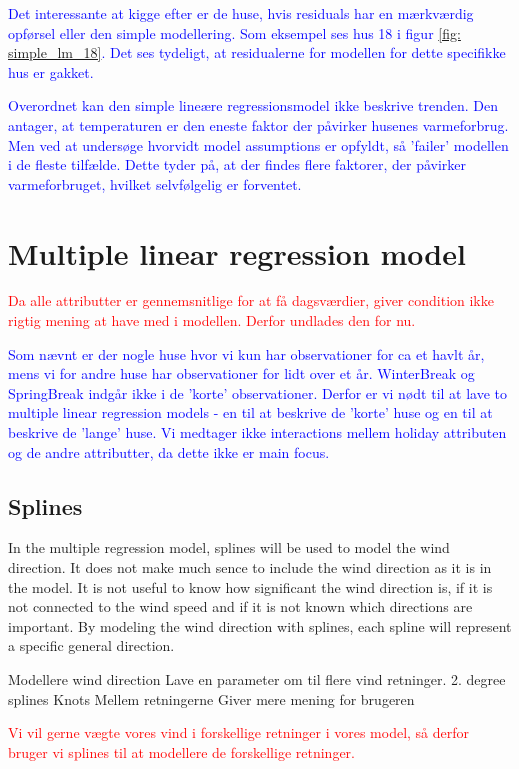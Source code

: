 \textcolor{blue}{Det interessante at kigge efter er de huse, hvis residuals har en mærkværdig opførsel eller den simple modellering. Som eksempel ses hus 18 i figur \ref{fig: simple_lm_18}. Det ses tydeligt, at residualerne for modellen for dette specifikke hus er gakket.}

\noindent \textcolor{blue}{Overordnet kan den simple lineære regressionsmodel ikke beskrive trenden. Den antager, at temperaturen er den eneste faktor der påvirker husenes varmeforbrug. Men ved at undersøge hvorvidt model assumptions er opfyldt, så 'failer' modellen i de fleste tilfælde. Dette tyder på, at der findes flere faktorer, der påvirker varmeforbruget, hvilket selvfølgelig er forventet.}

\section{Multiple linear regression model}

\textcolor{red}{Da alle attributter er gennemsnitlige for at få dagsværdier, giver condition ikke rigtig mening at have med i modellen. Derfor undlades den for nu.}

\noindent \textcolor{blue}{Som nævnt er der nogle huse hvor vi kun har observationer for ca et havlt år, mens vi for andre huse har observationer for lidt over et år. WinterBreak og SpringBreak indgår ikke i de 'korte' observationer. Derfor er vi nødt til at lave to multiple linear regression models - en til at beskrive de 'korte' huse og en til at beskrive de 'lange' huse. Vi medtager ikke interactions mellem holiday attributen og de andre attributter, da dette ikke er main focus. }

\subsection{Splines}
In the multiple regression model, splines will be used to model the wind direction. It does not make much sence to include the wind direction as it is in the model. It is not useful to know how significant the wind direction is, if it is not connected to the wind speed and if it is not known which directions are important. By modeling the wind direction with splines, each spline will represent a specific general direction.

Modellere wind direction
Lave en parameter om til flere vind retninger.
2. degree splines
Knots
Mellem retningerne
Giver mere mening for brugeren

\textcolor{red}{Vi vil gerne vægte vores vind i forskellige retninger i vores model, så derfor bruger vi splines til at modellere de forskellige retninger.} \\

